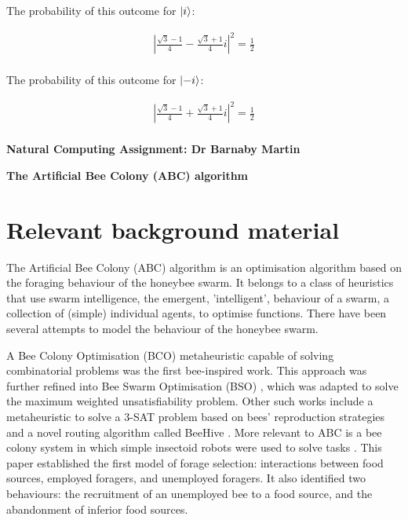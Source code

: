\documentclass{article}
\begin{document}
\begin{enumerate}
\begin{enumerate}
The probability of this outcome for $\ket{i}$:

\begin{align*}
  |\frac{\sqrt{3} - 1}{4} - \frac{\sqrt{3} + 1}{4}i |^2 = \frac{1}{2} \\
\end{align*}

The probability of this outcome for $\ket{-i}$:

\begin{align*}
  |\frac{\sqrt{3} - 1}{4} + \frac{\sqrt{3} + 1}{4}i |^2 = \frac{1}{2} \\
\end{align*}

	\end{enumerate}

\end{enumerate}

\newpage

\begin{center}
\large
{\bf Natural Computing Assignment: Dr Barnaby Martin}\bigskip

{\bf The Artificial Bee Colony (ABC) algorithm}
\normalsize
\end{center}

\section{Relevant background material}

The Artificial Bee Colony (ABC) algorithm is an optimisation algorithm based on the foraging behaviour of the honeybee swarm. It belongs to a class of heuristics that use swarm intelligence, the emergent, 'intelligent', behaviour of a swarm, a collection of (simple) individual agents, to optimise functions. There have been several attempts to model the behaviour of the honeybee swarm.

A Bee Colony Optimisation (BCO) metaheuristic \cite{T03} capable of solving combinatorial problems  was the first bee-inspired work. This approach was further refined into Bee Swarm Optimisation (BSO) \cite{D05} , which was adapted to solve the maximum weighted unsatisfiability problem. Other such works include a metaheuristic to solve a 3-SAT problem based on bees' reproduction strategies \cite{B05} and a novel routing algorithm called BeeHive \cite{W04}. More relevant to ABC is a bee colony system in which simple insectoid robots were used to solve tasks \cite{TL05}. This paper established the first model of forage selection: interactions between food sources, employed foragers, and unemployed foragers. It also identified two behaviours: the recruitment of an unemployed bee to a food source, and the abandonment of inferior food sources.
\end{document}
